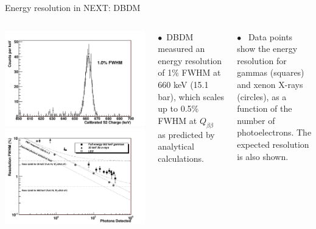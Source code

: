 \documentclass [aspectratio=169]{beamer}
\newcommand{\qbb}{\ensuremath{Q_{\beta\beta}}}
\begin{document}
\begin{frame}{Energy resolution in NEXT: DBDM}
\begin{columns}
\includegraphics[scale=0.30]{dbdm_res.png}
\includegraphics[scale=0.30]{dbdm_resolution.png}


$\bullet$~DBDM measured an energy resolution of 1\% FWHM at 660 keV (15.1 bar), which scales up to 0.5\% FWHM at \qbb\, as predicted by analytical calculations.

$\bullet$~ Data points show the energy resolution for gammas (squares) and xenon X-rays (circles), as 
a function of the number of photoelectrons. The expected resolution is also shown. 
\end{columns}
\end{frame}
\end{document}
